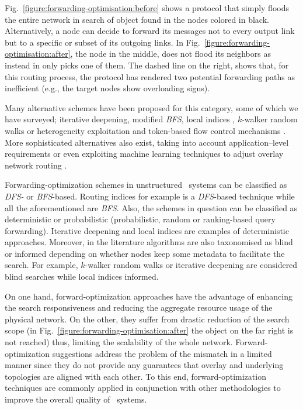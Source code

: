 Fig.~\ref{figure:forwarding-optimisation:before} 
shows a protocol that simply floods the entire network 
in search of object found in the nodes colored in black.
Alternatively, a node can decide to forward its
messages not to every output link but to a specific 
or subset of its outgoing links.
In Fig.~\ref{figure:forwarding-optimisation:after}, 
the node in the middle, does not flood its neighbors as instead 
in only picks one of them.
The dashed line on the right, shows that, 
for this routing process, the protocol has
rendered two potential forwarding paths as inefficient (e.g., the target nodes
show overloading signs).

Many alternative schemes have been proposed for this category, some of which we
have surveyed; iterative deepening, modified \emph{BFS}, local indices \cite{YG-M2002},
$k$-walker random walks \cite{LCCLS2002} or heterogeneity exploitation and
token-based flow control mechanisms \cite{CRBLS2003}. More sophisticated
alternatives also exist, taking into account application--level requirements
or even exploiting machine learning techniques to adjust overlay network
routing \cite{BFLZ2003}.

Forwarding-optimization schemes in unstructured \p\ systems can be classified
as \emph{DFS-} or \emph{BFS}-based. Routing indices \cite{CG-M2002} for example is a
\emph{DFS}-based technique while all the aforementioned are \emph{BFS}. Also,
the schemes in question can
be classified as deterministic or probabilistic (probabilistic, random or
ranking-based query forwarding). Iterative deepening and local indices
\cite{YG-M2002} are examples of deterministic approaches. Moreover, in the
literature algorithms are also taxonomised as blind or informed depending on
whether nodes keep some metadata to facilitate the search. For example,
$k$-walker random walks or iterative deepening are considered blind searches
while local indices informed.

On one hand, forward-optimization approaches have 
the advantage of enhancing the
search responsiveness and reducing the aggregate resource 
usage of the physical network. On the other, 
they suffer from drastic reduction of the search
scope (in Fig.~\ref{figure:forwarding-optimisation:after} the object on
the far right is not reached) thus, limiting the scalability of the whole
network. 
Forward-optimization suggestions address the problem of the mismatch 
in a limited manner since they do not provide any guarantees 
that overlay and underlying topologies are
aligned with each other.
To this end, forward-optimization techniques are commonly applied in
conjunction with other methodologies to improve 
the overall quality of \p\ systems.


